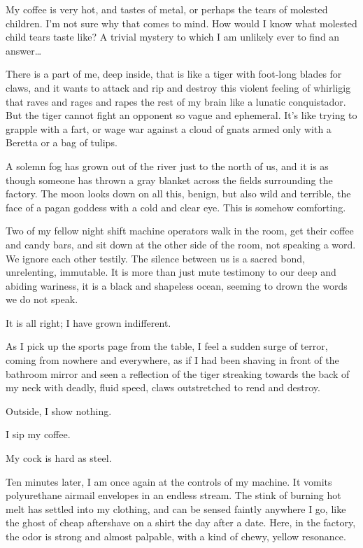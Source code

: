 My coffee is very hot, and tastes of metal, or perhaps the tears of
molested children. I'm not sure why that comes to mind. How
would I know what molested child tears taste like? A trivial
mystery to which I am unlikely ever to find an answer{\ldots}



There is a part of me, deep inside, that is like a tiger with
foot-long blades for claws, and it wants to attack and rip and
destroy this violent feeling of whirligig that raves and rages and
rapes the rest of my brain like a lunatic conquistador. But the
tiger cannot fight an opponent so vague and ephemeral. It's
like trying to grapple with a fart, or wage war against a cloud of
gnats armed only with a Beretta or a bag of tulips.



A solemn fog has grown out of the river just to the north of us,
and it is as though someone has thrown a gray blanket across the
fields surrounding the factory. The moon looks down on all this,
benign, but also wild and terrible, the face of a pagan goddess
with a cold and clear eye. This is somehow comforting.



Two of my fellow night shift machine operators walk in the room,
get their coffee and candy bars, and sit down at the other side of
the room, not speaking a word. We ignore each other testily. The
silence between us is a sacred bond, unrelenting, immutable. It is
more than just mute testimony to our deep and abiding wariness, it
is a black and shapeless ocean, seeming to drown the words we do
not speak.



It is all right; I have grown indifferent.



As I pick up the sports page from the table, I feel a sudden surge
of terror, coming from nowhere and everywhere, as if I had been
shaving in front of the bathroom mirror and seen a reflection of
the tiger streaking towards the back of my neck with deadly, fluid
speed, claws outstretched to rend and destroy.



Outside, I show nothing.



I sip my coffee.



My cock is hard as steel.



Ten minutes later, I am once again at the controls of my machine.
It vomits polyurethane airmail envelopes in an endless stream. The
stink of burning hot melt has settled into my clothing, and can be
sensed faintly anywhere I go, like the ghost of cheap aftershave on
a shirt the day after a date. Here, in the factory, the odor is
strong and almost palpable, with a kind of chewy, yellow
resonance.




